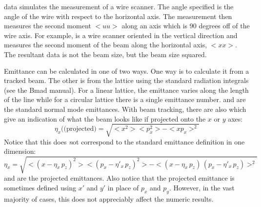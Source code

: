 data simulates the measurement of a wire scanner. The angle specified
is the angle of the wire with respect to the horizontal axis. The measurement
then measures the second moment $<uu>$ along an axis which is 90 degrees off of
the wire axis. For example,  is a wire scanner oriented in the
vertical direction and measures the second moment of the beam along the
horizontal axis, $<xx>$. The resultant data is not the beam size, but the beam
size squared.

Emittance can be calculated in one of two ways. One way is to
calculate it from a tracked beam. The other is from the lattice using
the standard radiation integrals (see the Bmad manual). For a linear
lattice, the emittance varies along the length of the line while for a
circular lattice there is a single emittance number. 
and  are the standard normal mode emittances. With
beam tracking, there are also  which give an
indication of what the beam looks like if projected onto the $x$ or
$y$ axes:
\begin{equation}
  \eta_x (\mbox{(projected)} = \sqrt{<x^2> <p_x^2> - <x p_x>^2}
\end{equation}
Notice that this does {\emph not} correspond to the standard emittance
definition in one dimension:
\begin{equation}
  \eta_x = \sqrt{<(x - \eta_x \, p_z)^2> <(p_x - \eta'_x \, p_z)^2> - 
  <(x - \eta_x \, p_z) \, (p_x - \eta'_x \, p_z)>^2}
\end{equation}
 and  are the projected emittances.
Also notice that the projected emittance is sometimes defined using
$x'$ and $y'$ in place of $p_x$ and $p_y$. However, in the vast
majority of cases, this does not appreciably affect the numeric
results.

